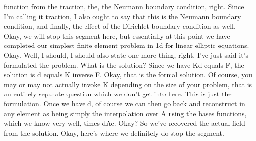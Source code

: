 \documentclass[10pt]{article}
\begin{document}
function from the traction, the, the Neumann boundary condition, right. Since I'm calling it traction, I also ought to say that this is the Neumann boundary condition, and finally, the effect of the Dirichlet boundary condition as well. Okay, we will stop this segment here, but essentially at this point we have completed our simplest finite element problem in 1d for linear elliptic equations. Okay. Well, I should, I should also state one more thing, right. I've just said it's formulated the problem. What is the solution? Since we have Kd equals F, the solution is d equals K inverse F. Okay, that is the formal solution. Of course, you may or may not actually invoke K depending on the size of your problem, that is an entirely separate question which we don't get into here. This is just the formulation. Once we have d, of course we can then go back and reconstruct in any element as being simply the interpolation over A using the bases functions, which we know very well, times dAe. Okay? So we've recovered the actual field from the solution. Okay, here's where we definitely do stop the segment.
\end{document}
